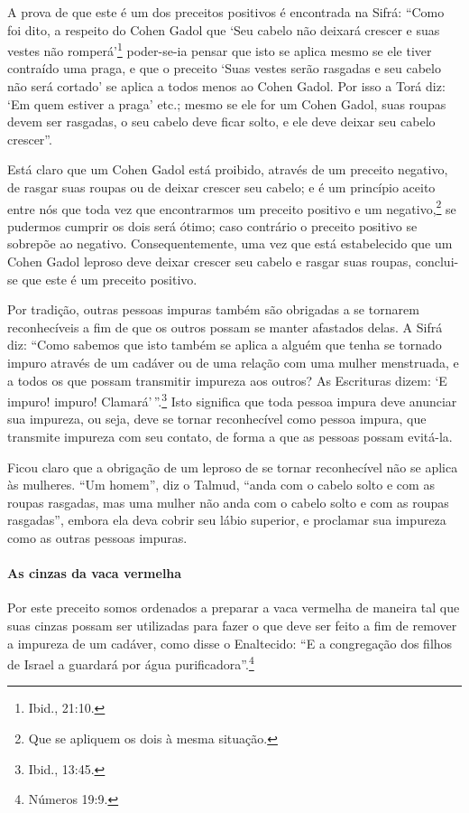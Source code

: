 A prova de que este é um dos preceitos positivos é encontrada na Sifrá:
``Como foi dito, a respeito do Cohen Gadol que `Seu cabelo não deixará
crescer e suas vestes não romperá'\footnote{Ibid., 21:10.} poder-se-ia pensar que
isto se aplica mesmo se ele tiver contraído uma praga, e que o preceito
`Suas vestes serão rasgadas e seu cabelo não será cortado' se aplica a
todos menos ao Cohen Gadol. Por isso a Torá diz: `Em quem estiver a
praga' etc.; mesmo se ele for um Cohen Gadol, suas roupas devem ser
rasgadas, o seu cabelo deve ficar solto, e ele deve deixar seu cabelo
crescer''.

Está claro que um Cohen Gadol está proibido, através de um preceito negativo, de rasgar suas roupas ou de deixar crescer seu cabelo; e
é um princípio aceito entre nós que toda vez que encontrarmos um
preceito positivo e um negativo,\footnote{Que se apliquem os dois à mesma situação.} se pudermos
cumprir os dois será ótimo; caso contrário o preceito positivo se
sobrepõe ao negativo. Consequentemente, uma vez que está estabelecido
que um Cohen Gadol leproso deve deixar crescer seu cabelo e rasgar
suas roupas, conclui-se que este é um preceito positivo.

Por tradição, outras pessoas impuras também são obrigadas a se tornarem
reconhecíveis a fim de que os outros possam se manter afastados delas. A
Sifrá diz: ``Como sabemos que isto também se aplica a alguém que tenha
se tornado impuro através de um cadáver ou de uma relação com uma
mulher menstruada, e a todos os que possam transmitir impureza aos
outros? As Escrituras dizem: `E impuro! impuro! Clamará'\,''.\footnote{Ibid.,
13:45.} Isto significa que toda pessoa impura deve anunciar sua
impureza, ou seja, deve se tornar reconhecível como pessoa impura, que
transmite impureza com seu contato, de forma a que as pessoas possam
evitá-la.

Ficou claro que a obrigação de um leproso de se tornar reconhecível não
se aplica às mulheres. ``Um homem'', diz o Talmud, ``anda com o cabelo
solto e com as roupas rasgadas, mas uma mulher não anda com o cabelo
solto e com as roupas rasgadas'', embora ela deva cobrir seu lábio
superior, e proclamar sua impureza como as outras pessoas impuras.

\paragraph{As cinzas da vaca vermelha}

Por este preceito somos ordenados a preparar a vaca vermelha de maneira
tal que suas cinzas possam ser utilizadas para fazer o que deve ser
feito a fim de remover a impureza de um cadáver, como disse o
Enaltecido: ``E a congregação dos filhos de Israel a guardará por água
purificadora''.\footnote{Números 19:9.}

